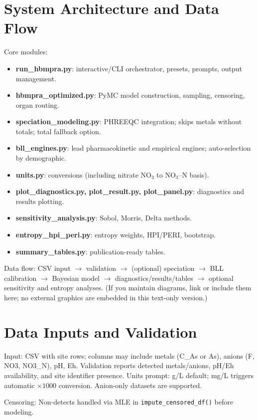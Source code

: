 \documentclass[11pt,a4paper]{article}
\begin{document}
\section{System Architecture and Data Flow}\label{sec:architecture}
Core modules:\begin{itemize}
  \item \textbf{run\_hbmpra.py}: interactive/CLI orchestrator, presets, prompts, output management.
  \item \textbf{hbmpra\_optimized.py}: PyMC model construction, sampling, censoring, organ routing.
  \item \textbf{speciation\_modeling.py}: PHREEQC integration; skips metals without totals; total fallback option.
  \item \textbf{bll\_engines.py}: lead pharmacokinetic and empirical engines; auto-selection by demographic.
  \item \textbf{units.py}: conversions (including nitrate NO$_3$ to NO$_3$--N basis).
  \item \textbf{plot\_diagnostics.py, plot\_result.py, plot\_panel.py}: diagnostics and results plotting.
  \item \textbf{sensitivity\_analysis.py}: Sobol, Morris, Delta methods.
  \item \textbf{entropy\_hpi\_peri.py}: entropy weights, HPI/PERI, bootstrap.
  \item \textbf{summary\_tables.py}: publication-ready tables.
\end{itemize}
Data flow: CSV input $\rightarrow$ validation $\rightarrow$ (optional) speciation $\rightarrow$ BLL calibration $\rightarrow$ Bayesian model $\rightarrow$ diagnostics/results/tables $\rightarrow$ optional sensitivity and entropy analyses. (If you maintain diagrams, link or include them here; no external graphics are embedded in this text-only version.)

\section{Data Inputs and Validation}\label{sec:inputs}
Input: CSV with site rows; columns may include metals (C\_As or As), anions (F, NO3, NO3\_N), pH, Eh. Validation reports detected metals/anions, pH/Eh availability, and site identifier presence. Units prompt: \textmu g/L default; mg/L triggers automatic $\times 1000$ conversion. Anion-only datasets are supported.

Censoring: Non-detects handled via MLE in \texttt{impute\_censored\_df()} before modeling.
\end{document}
